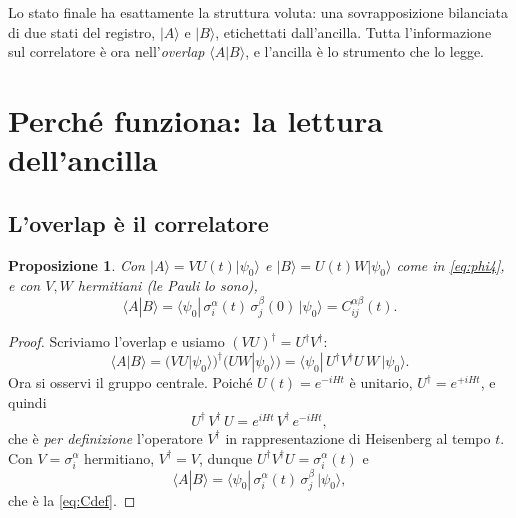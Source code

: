 \documentclass[11pt,a4paper]{article}
\newtheorem{proposizione}{Proposizione}
\begin{document}
Lo stato finale ha esattamente la struttura voluta: una sovrapposizione bilanciata di due stati
del registro, $|A\rangle$ e $|B\rangle$, etichettati dall'ancilla. Tutta l'informazione sul
correlatore è ora nell'\emph{overlap} $\langle A|B\rangle$, e l'ancilla è lo strumento che lo
legge.

\section{Perché funziona: la lettura dell'ancilla}

\subsection{L'overlap è il correlatore}

\begin{proposizione}
Con $|A\rangle=VU(t)|\psi_0\rangle$ e $|B\rangle=U(t)W|\psi_0\rangle$ come in \eqref{eq:phi4},
e con $V,W$ hermitiani (le Pauli lo sono),
\begin{equation}
\langle A|B\rangle=\langle\psi_0|\,\sigma_i^\alpha(t)\,\sigma_j^\beta(0)\,|\psi_0\rangle
= C_{ij}^{\alpha\beta}(t).
\end{equation}
\end{proposizione}

\begin{proof}
Scriviamo l'overlap e usiamo $(VU)^\dagger=U^\dagger V^\dagger$:
\begin{equation}
\langle A|B\rangle=\big(VU|\psi_0\rangle\big)^\dagger\big(UW|\psi_0\rangle\big)
=\langle\psi_0|\,U^\dagger V^\dagger U\,W\,|\psi_0\rangle .
\end{equation}
Ora si osservi il gruppo centrale. Poiché $U(t)=e^{-iHt}$ è unitario, $U^\dagger=e^{+iHt}$, e
quindi
\begin{equation}
U^\dagger\,V^\dagger\,U = e^{iHt}\,V^\dagger\,e^{-iHt},
\end{equation}
che è \emph{per definizione} l'operatore $V^\dagger$ in rappresentazione di Heisenberg al tempo
$t$. Con $V=\sigma_i^\alpha$ hermitiano, $V^\dagger=V$, dunque
$U^\dagger V^\dagger U=\sigma_i^\alpha(t)$ e
\begin{equation}
\langle A|B\rangle=\langle\psi_0|\,\sigma_i^\alpha(t)\,\sigma_j^\beta\,|\psi_0\rangle,
\end{equation}
che è la \eqref{eq:Cdef}.
\end{proof}
\end{document}
